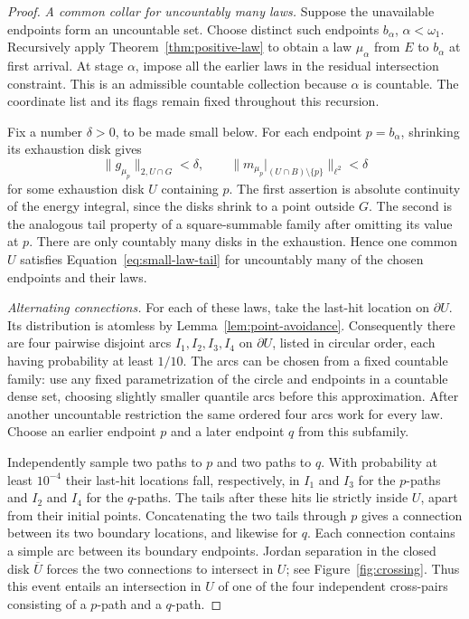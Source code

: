 \begin{proof}
\emph{A common collar for uncountably many laws.}
Suppose the unavailable endpoints form an uncountable set.  Choose
distinct such endpoints $b_\alpha$, $\alpha<\omega_1$.  Recursively apply
Theorem~\ref{thm:positive-law} to obtain a law $\mu_\alpha$ from $E$ to
$b_\alpha$ at first arrival.  At stage $\alpha$, impose all the earlier
laws in the residual intersection constraint.  This is an admissible
countable collection because $\alpha$ is countable.  The coordinate
list and its flags remain fixed throughout this recursion.

Fix a number $\delta>0$, to be made small below.  For each endpoint
$p=b_\alpha$, shrinking its exhaustion disk gives
\begin{equation}
 \label{eq:small-law-tail}
 \|g_{\mu_p}\|_{2,U\cap G}<\delta,
 \qquad
 \|m_{\mu_p}|_{(U\cap B)\setminus\{p\}}\|_{\ell^2}<\delta
\end{equation}
for some exhaustion disk $U$ containing $p$.  The first assertion is
absolute continuity of the energy integral, since the disks shrink to
a point outside $G$.  The second is the analogous tail property of a
square-summable family after omitting its value at $p$.  There are only
countably many disks in the exhaustion.  Hence one common $U$ satisfies
Equation~\eqref{eq:small-law-tail} for uncountably many of the chosen
endpoints and their laws.

\smallskip\noindent\emph{Alternating connections.}
For each of these laws, take the last-hit location on $\partial U$.
Its distribution is atomless by Lemma~\ref{lem:point-avoidance}.
Consequently there are four pairwise disjoint arcs $I_1,I_2,I_3,I_4$ on
$\partial U$, listed in circular order, each having probability at least $1/10$.
The arcs can be chosen from a fixed countable family: use any fixed
parametrization of the circle and endpoints in a countable dense set,
choosing slightly smaller quantile arcs before this approximation.
After another uncountable restriction the same ordered four arcs work
for every law.  Choose an earlier endpoint $p$ and a later endpoint
$q$ from this subfamily.

Independently sample two paths to $p$ and two paths to $q$.  With
probability at least $10^{-4}$ their last-hit locations fall,
respectively, in $I_1$ and $I_3$ for the $p$-paths and $I_2$ and
$I_4$ for the $q$-paths.  The tails after these hits lie strictly inside
$U$, apart from their initial points.  Concatenating the two tails
through $p$ gives a connection between its two boundary locations, and
likewise for $q$.  Each connection contains a simple arc between its
boundary endpoints.  Jordan separation in the closed disk
$\overline U$ forces the two connections to intersect in $U$; see
Figure~\ref{fig:crossing}.
Thus this event entails an intersection in $U$ of one of the four
independent cross-pairs consisting of a $p$-path and a $q$-path.


\end{proof}
